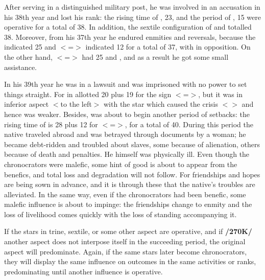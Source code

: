 After serving in a distinguished military post, he was involved in an accusation in his 38th year and lost his rank: the rising time of \Taurus, 23, and the period of \Mars, 15 were operative for a total of 38. In addition, the sextile configuration of \Saturn\xspace and \Venus\xspace totalled 38. Moreover, from his 37th year he endured enmities and reversals, because the \Moon\xspace indicated 25 and \Sagittarius\xspace $<$=\Jupiter$>$ indicated 12 for a total of 37, with \Saturn\xspace in opposition. On the other hand, \Cancer\xspace $<$=\Moon$>$ had 25 and \Jupiter\xspace 12, and as a result he got some small assistance. 

In his 39th year he was in a lawsuit and was imprisoned with no power to set things straight. For \Mercury\xspace in \Leo allotted 20
plus 19 for the sign $<$=\Sun$>$, but it was in inferior aspect $<$\Sextile to the left$>$ with the star which caused the crisis $<$\Saturn$>$ and hence was weaker. Besides, \Saturn\xspace was about to begin another period of setbacks: the rising time of \Gemini\xspace is 28 plus 12 for \Sagittarius\xspace $<$=\Jupiter$>$, for a total of 40. During this period the native traveled abroad and was betrayed through documents by a woman; he became debt-ridden and troubled about slaves, some because of alienation, others because of death and penalties. He himself was physically ill. Even though the chronocrators were malefic, some hint of good is about to appear from the benefics, and total loss and degradation will not follow. For friendships and hopes are being sown in advance, and it is through these that the native’s troubles are alleviated. In the same way, even if the chronocrators had been benefic, some malefic influence is about to impinge: the friendships change to enmity and the loss of livelihood comes quickly with the loss of standing accompanying it. 

If the stars in trine, sextile, or some other aspect are operative, and if \textbf{/270K/} another aspect does not interpose itself in the succeeding period, the original aspect will predominate. Again, if the same stars later become chronocrators, they will display the same influence on outcomes in the same activities or ranks, predominating until another influence is operative.

